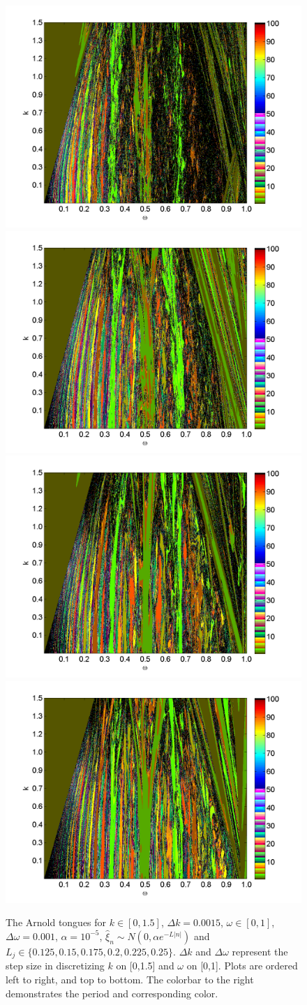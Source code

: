 \begin{figure}[H]\linespread{1}  
\caption[The Arnold tongues for the random circle map, normal
distribution, $\alpha = 10^{-5}$, $L \in (0.1,0.3)$]{The Arnold
  tongues for $k\in [0,1.5]$, $\Delta k = 0.0015$, $\omega \in [0,1]$,
  $\Delta \omega = 0.001$, $\alpha = 10^{-5}$, $\hat{\xi}_n\sim
  N(0,\alpha e^{-L|n|})$ and $L_j \in
  \{0.125,0.15,0.175,0.2,0.225,0.25\}$. $\Delta k$ and $\Delta \omega$
  represent the step size in discretizing $k$ on [0,1.5] and $\omega$
  on [0,1]. Plots are ordered left to right, and top to bottom. The colorbar
to the right demonstrates the period and corresponding color.}\label{fig:rcirctongues_n2}
\centering
\includegraphics[width=.5\textwidth]{figs/tongues_n_ma_1000_L_0125.png}\hfill
\includegraphics[width=.5\textwidth]{figs/tongues_n_ma_1000_L_015.png}\\
\includegraphics[width=.5\textwidth]{figs/tongues_n_ma_1000_L_0175.png}\hfill
\includegraphics[width=.5\textwidth]{figs/tongues_n_ma_1000_L_02.png}\\

\end{figure}
